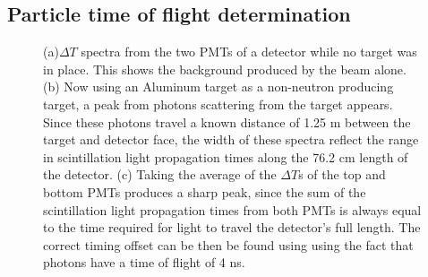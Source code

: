 \subsection{Particle time of flight determination}
\label{reconstruction}
\begin{figure}[htbp]
\begin{center}
\end{center}

\caption{(a)$\Delta T$ spectra from the two PMTs of a detector while no target was in place.  This shows the background produced by the beam alone.
(b) Now using an Aluminum target as a non-neutron producing target, a peak from photons scattering from the target appears.
Since these photons travel a known distance of 1.25 m between the target and detector face, the width of these spectra reflect the range in scintillation light propagation times along the 76.2 cm length of the detector.
(c) Taking the average of the $\Delta T$s of the top and bottom PMTs produces a sharp peak, since the sum of the scintillation light propagation times from both PMTs is always equal to the time required for light to travel the detector's full length.
The correct timing offset can be then be found using using the fact that photons have a time of flight of 4 ns. }
\label{fig:ToFDetermination}
\end{figure}

